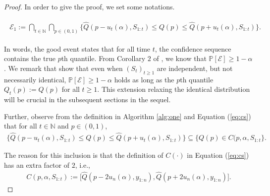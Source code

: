 \begin{proof}
In order to give the proof, we set some notations. 

%
\begin{definition} %
\begin{align}
\begin{split}
    \mathcal{E}_1 := \bigcap_{t \in \mathbb{N}} \bigcap_{p \in (0,1)} 
 \{  \widehat{Q}(p-u_t(\alpha), S_{1:t}) \leq Q(p) \leq \widehat{Q}(p+u_t(\alpha), S_{1:t}) \} .
\end{split}
\label{eqn:good_event_defn}
\end{align}   
\end{definition}
\vspace{-0.5em}
%
In words, the good event states that for all time $t$, the confidence sequence contains the true $p$th quantile.
From Corollary $2$ of \cite{howard2022sequential}, we know that $\mathbb{P}[\mathcal{E}] \geq 1-\alpha$. We remark that \cite{howard2022sequential} show that even when $(S_t)_{t \geq 1}$ are independent, but not necessarily identical, $\mathbb{P}[\mathcal{E}] \geq 1-\alpha$ holds as long as the $p$th quantile $Q_t(p) := Q(p)$ for all $t \geq 1$. This extension relaxing the identical distribution will be crucial in the subsequent sections in the sequel. 

Further, observe from the definition in Algorithm \ref{alg:one} and Equation (\ref{eq:cs}) that for all $t\in \mathbb{N}$ and $p \in (0,1)$,
\begin{align*}
     \{  \widehat{Q}(p-u_t(\alpha), S_{1:t}) \leq Q(p) \leq \widehat{Q}(p+u_t(\alpha), S_{1:t}) \} \subseteq \{ Q(p) \in C(p,\alpha, S_{1:t} \}.
\end{align*}

The reason for this inclusion is that the definition of $C(\cdot)$ in Equation (\ref{eq:cs}) has an extra factor of $2$, i.e., 
\begin{align*}
    C(p,\alpha,S_{1:t}) :=  \bigg[ \widehat{Q}(p- 2u_{n}(\alpha), y_{1:n}),  \widehat{Q}(p+2u_{n}(\alpha), y_{1:n}) \bigg].
\end{align*}




\end{proof}

